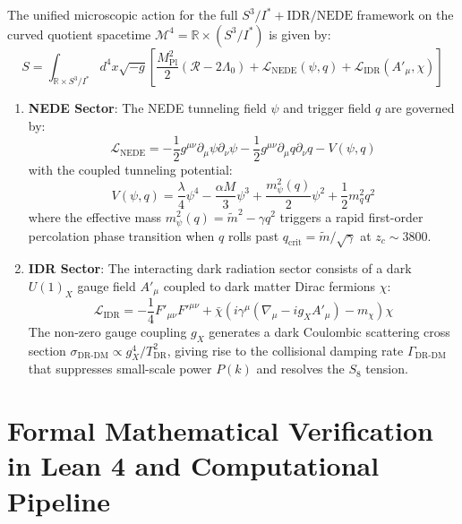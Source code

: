 \documentclass[11pt,a4paper]{article}
\theoremstyle{definition}
\newcommand{\NEDE}{\mathrm{NEDE}}
\newcommand{\IDR}{\mathrm{IDR}}
\begin{document}
The unified microscopic action for the full $S^3/I^* + \IDR/\NEDE$ framework on the curved quotient spacetime $\mathcal{M}^4 = \mathbb{R} \times (S^3/I^*)$ is given by:
\begin{equation}
S = \int_{\mathbb{R} \times S^3/I^*} d^4x \sqrt{-g} \left[ \frac{M_{\mathrm{Pl}}^2}{2}\left( \mathcal{R} - 2\Lambda_0 \right) + \mathcal{L}_{\mathrm{NEDE}}(\psi, q) + \mathcal{L}_{\mathrm{IDR}}(A'_\mu, \chi) \right]
\end{equation}

\begin{enumerate}
    \item \textbf{NEDE Sector}:
    The NEDE tunneling field $\psi$ and trigger field $q$ are governed by:
    \begin{equation}
    \mathcal{L}_{\mathrm{NEDE}} = -\frac{1}{2} g^{\mu\nu} \partial_\mu \psi \partial_\nu \psi - \frac{1}{2} g^{\mu\nu} \partial_\mu q \partial_\nu q - V(\psi, q)
    \end{equation}
    with the coupled tunneling potential:
    \begin{equation}
    V(\psi, q) = \frac{\lambda}{4} \psi^4 - \frac{\alpha M}{3} \psi^3 + \frac{m_\psi^2(q)}{2} \psi^2 + \frac{1}{2} m_q^2 q^2
    \end{equation}
    where the effective mass $m_\psi^2(q) = \tilde{m}^2 - \gamma q^2$ triggers a rapid first-order percolation phase transition when $q$ rolls past $q_{\mathrm{crit}} = \tilde{m}/\sqrt{\gamma}$ at $z_c \sim 3800$.

    \item \textbf{IDR Sector}:
    The interacting dark radiation sector consists of a dark $U(1)_X$ gauge field $A'_\mu$ coupled to dark matter Dirac fermions $\chi$:
    \begin{equation}
    \mathcal{L}_{\mathrm{IDR}} = -\frac{1}{4} F'_{\mu\nu} F'^{\mu\nu} + \bar{\chi} \left( i\gamma^\mu (\nabla_\mu - i g_X A'_\mu) - m_\chi \right) \chi
    \end{equation}
    The non-zero gauge coupling $g_X$ generates a dark Coulombic scattering cross section $\sigma_{\mathrm{DR}\text{-}\mathrm{DM}} \propto g_X^4 / T_{\mathrm{DR}}^2$, giving rise to the collisional damping rate $\Gamma_{\mathrm{DR}\text{-}\mathrm{DM}}$ that suppresses small-scale power $P(k)$ and resolves the $S_8$ tension.
\end{enumerate}

\section{Formal Mathematical Verification in Lean 4 and Computational Pipeline}
\end{document}
